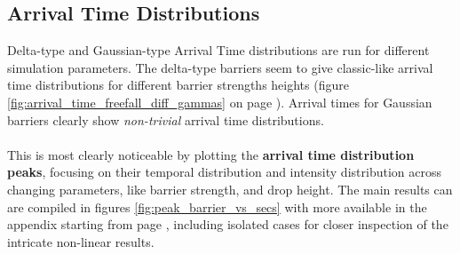\subsection{Arrival Time Distributions}

Delta-type and Gaussian-type Arrival Time distributions are run for different simulation parameters. The delta-type barriers seem to give classic-like arrival time distributions for different barrier strengths heights (figure \ref{fig:arrival_time_freefall_diff_gammas} on page \pageref{fig:arrival_time_freefall_diff_gammas}). Arrival times for Gaussian barriers clearly show \textit{non-trivial} arrival time distributions.
\\\\
This is most clearly noticeable by plotting the \textbf{arrival time distribution peaks}, focusing on their temporal distribution and intensity distribution across changing parameters, like barrier strength, and drop height. The main results can are compiled in figures \ref{fig:peak_barrier_vs_secs} with more available in the appendix starting from page \pageref{fig:particle_drop_height_power}, including isolated cases for closer inspection of the intricate non-linear results.


